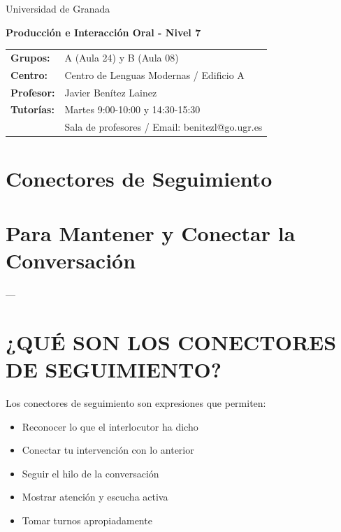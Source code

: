 \documentclass[a4paper,11pt]{article}
\begin{document}
\begin{center}
\small{Universidad de Granada}

\vspace{0.3cm}

\textbf{\large{Producción e Interacción Oral - Nivel 7}}

\vspace{0.4cm}

\small
\begin{tabular}{@{}ll@{}}
\textbf{Grupos:} & A (Aula 24) y B (Aula 08) \\
\textbf{Centro:} & Centro de Lenguas Modernas / Edificio A \\
\textbf{Profesor:} & Javier Benítez Lainez \\
\textbf{Tutorías:} & Martes 9:00-10:00 y 14:30-15:30 \\
& Sala de profesores / Email: benitezl@go.ugr.es
\end{tabular}
\end{center}

\vspace{0.5cm}
\section*{Conectores de Seguimiento}

\vspace{0.4cm}

\section{Para Mantener y Conectar la Conversación}

\vspace{0.2cm}

---

\vspace{0.2cm}

\section{¿QUÉ SON LOS CONECTORES DE SEGUIMIENTO?}

\vspace{0.2cm}

Los conectores de seguimiento son expresiones que permiten:

\begin{itemize}

  \item Reconocer lo que el interlocutor ha dicho

  \item Conectar tu intervención con lo anterior

  \item Seguir el hilo de la conversación

  \item Mostrar atención y escucha activa

  \item Tomar turnos apropiadamente

\end{itemize}
\end{document}

